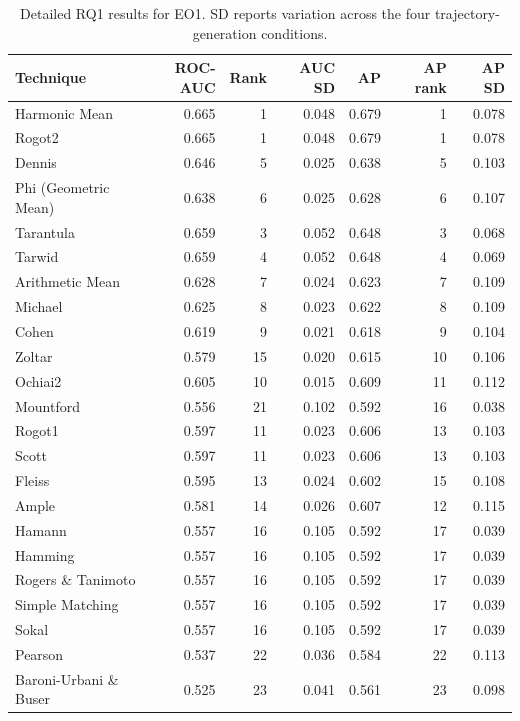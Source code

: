 \begin{table}[t]
\centering
\caption{Detailed RQ1 results for EO1. SD reports variation across the four trajectory-generation conditions.}
\label{tab:rq1-supplementary-eo1}
{\scriptsize
\setlength{\tabcolsep}{4pt}
\renewcommand{\arraystretch}{0.96}
\begin{tabular}{lrrrrrr}
\toprule
Technique & ROC-AUC & Rank & AUC SD & AP & AP rank & AP SD \\
\midrule
Harmonic Mean & 0.665 & 1 & 0.048 & 0.679 & 1 & 0.078 \\
Rogot2 & 0.665 & 1 & 0.048 & 0.679 & 1 & 0.078 \\
Dennis & 0.646 & 5 & 0.025 & 0.638 & 5 & 0.103 \\
Phi (Geometric Mean) & 0.638 & 6 & 0.025 & 0.628 & 6 & 0.107 \\
Tarantula & 0.659 & 3 & 0.052 & 0.648 & 3 & 0.068 \\
Tarwid & 0.659 & 4 & 0.052 & 0.648 & 4 & 0.069 \\
Arithmetic Mean & 0.628 & 7 & 0.024 & 0.623 & 7 & 0.109 \\
Michael & 0.625 & 8 & 0.023 & 0.622 & 8 & 0.109 \\
Cohen & 0.619 & 9 & 0.021 & 0.618 & 9 & 0.104 \\
Zoltar & 0.579 & 15 & 0.020 & 0.615 & 10 & 0.106 \\
Ochiai2 & 0.605 & 10 & 0.015 & 0.609 & 11 & 0.112 \\
Mountford & 0.556 & 21 & 0.102 & 0.592 & 16 & 0.038 \\
Rogot1 & 0.597 & 11 & 0.023 & 0.606 & 13 & 0.103 \\
Scott & 0.597 & 11 & 0.023 & 0.606 & 13 & 0.103 \\
Fleiss & 0.595 & 13 & 0.024 & 0.602 & 15 & 0.108 \\
Ample & 0.581 & 14 & 0.026 & 0.607 & 12 & 0.115 \\
Hamann & 0.557 & 16 & 0.105 & 0.592 & 17 & 0.039 \\
Hamming & 0.557 & 16 & 0.105 & 0.592 & 17 & 0.039 \\
Rogers \& Tanimoto & 0.557 & 16 & 0.105 & 0.592 & 17 & 0.039 \\
Simple Matching & 0.557 & 16 & 0.105 & 0.592 & 17 & 0.039 \\
Sokal & 0.557 & 16 & 0.105 & 0.592 & 17 & 0.039 \\
Pearson & 0.537 & 22 & 0.036 & 0.584 & 22 & 0.113 \\
Baroni-Urbani \& Buser & 0.525 & 23 & 0.041 & 0.561 & 23 & 0.098 \\

\end{tabular}}
\end{table}
